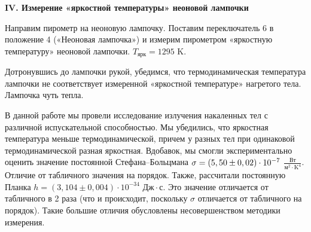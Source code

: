	\begin{center}
		\textbf{IV. Измерение «яркостной температуры» неоновой лампочки}
	\end{center}
	Направим пирометр на неоновую лампочку. Поставим переключатель 6 в положение 4 («Неоновая лампочка») и измерим пирометром «яркостную температуру» неоновой лампочки. $T_\text{ярк} = 1295$ K. 
	
	Дотронувшись до лампочки рукой, убедимся, что термодинамическая температура лампочки не соответствует измеренной «яркостной температуре» нагретого тела.
Лампочка чуть тепла.
	
	
	В данной работе мы провели исследование излучения накаленных тел с различной испускательной способностью. Мы убедились, что яркостная температура меньше термодинамической, причем у разных тел при одинаковой термодинамической разная яркостная. Вдобавок, мы смогли экспериментально оценить значение постоянной Стефана--Больцмана $\\\sigma = (5,50 \pm 0,02) \cdot 10^{-7}$ $\frac{\text{Вт}}{\text{м}^2 \cdot \text{K}^4}$. Отличие от табличного значения на порядок. Также, рассчитали постоянную Планка $h = (3,104 \pm 0,004) \cdot 10^{-34} \text{ Дж}\cdot\text{с}$. Это значение отличается от табличного в 2 раза (что и происходит, поскольку $\sigma$ отличается от табличного на порядок). Такие большие отличия обусловлены несовершенством методики измерения.
		
